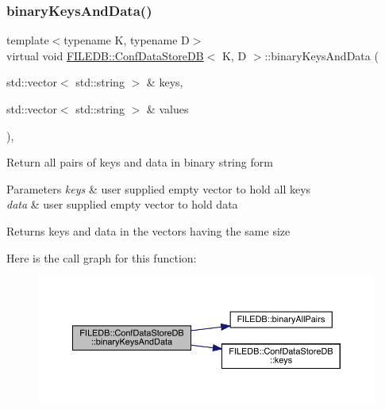\subsubsection{\texorpdfstring{binaryKeysAndData()}{binaryKeysAndData()}\hspace{0.1cm}{\footnotesize\ttfamily [2/2]}}
{\footnotesize\ttfamily template$<$typename K, typename D$>$ \\
virtual void \mbox{\hyperlink{classFILEDB_1_1ConfDataStoreDB}{F\+I\+L\+E\+D\+B\+::\+Conf\+Data\+Store\+DB}}$<$ K, D $>$\+::binary\+Keys\+And\+Data (\begin{DoxyParamCaption}\item[{std\+::vector$<$ std\+::string $>$ \&}]{keys,  }\item[{std\+::vector$<$ std\+::string $>$ \&}]{values }\end{DoxyParamCaption})\hspace{0.3cm}{\ttfamily [inline]}, {\ttfamily [virtual]}}

Return all pairs of keys and data in binary string form 
\begin{DoxyParams}{Parameters}
{\em keys} & user supplied empty vector to hold all keys \\
\hline
{\em data} & user supplied empty vector to hold data \\
\hline
\end{DoxyParams}
\begin{DoxyReturn}{Returns}
keys and data in the vectors having the same size 
\end{DoxyReturn}
Here is the call graph for this function\+:
\nopagebreak
\begin{figure}[H]
\begin{center}
\leavevmode
\includegraphics[width=350pt]{d8/d19/classFILEDB_1_1ConfDataStoreDB_ae38beaf9ba3f8629f2c322a3c5a23357_cgraph}
\end{center}
\end{figure}
\mbox{\label{classFILEDB_1_1ConfDataStoreDB_aa322ea0136b8eacc11df2b5b52b3b6d5}} 
